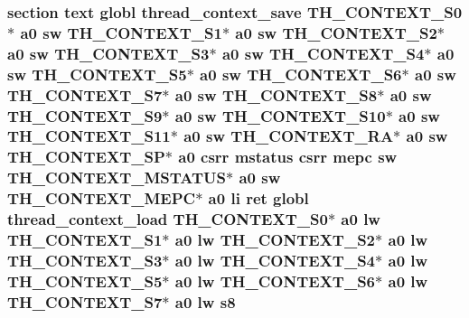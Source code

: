 \hypertarget{riscv_2threada_8S_a8be515ea1b76ad636be3ffda6de9a4f3}{
\subsubsection[{s8}]{\setlength{\rightskip}{0pt plus 5cm}section text globl {\bf thread\-\_\-context\-\_\-save} {\bf T\-H\-\_\-\-C\-O\-N\-T\-E\-X\-T\-\_\-\-S0}$\ast$ {\bf a0} {\bf sw} {\bf T\-H\-\_\-\-C\-O\-N\-T\-E\-X\-T\-\_\-\-S1}$\ast$ {\bf a0} {\bf sw} {\bf T\-H\-\_\-\-C\-O\-N\-T\-E\-X\-T\-\_\-\-S2}$\ast$ {\bf a0} {\bf sw} {\bf T\-H\-\_\-\-C\-O\-N\-T\-E\-X\-T\-\_\-\-S3}$\ast$ {\bf a0} {\bf sw} {\bf T\-H\-\_\-\-C\-O\-N\-T\-E\-X\-T\-\_\-\-S4}$\ast$ {\bf a0} {\bf sw} {\bf T\-H\-\_\-\-C\-O\-N\-T\-E\-X\-T\-\_\-\-S5}$\ast$ {\bf a0} {\bf sw} {\bf T\-H\-\_\-\-C\-O\-N\-T\-E\-X\-T\-\_\-\-S6}$\ast$ {\bf a0} {\bf sw} {\bf T\-H\-\_\-\-C\-O\-N\-T\-E\-X\-T\-\_\-\-S7}$\ast$ {\bf a0} {\bf sw} {\bf T\-H\-\_\-\-C\-O\-N\-T\-E\-X\-T\-\_\-\-S8}$\ast$ {\bf a0} {\bf sw} {\bf T\-H\-\_\-\-C\-O\-N\-T\-E\-X\-T\-\_\-\-S9}$\ast$ {\bf a0} {\bf sw} {\bf T\-H\-\_\-\-C\-O\-N\-T\-E\-X\-T\-\_\-\-S10}$\ast$ {\bf a0} {\bf sw} {\bf T\-H\-\_\-\-C\-O\-N\-T\-E\-X\-T\-\_\-\-S11}$\ast$ {\bf a0} {\bf sw} {\bf T\-H\-\_\-\-C\-O\-N\-T\-E\-X\-T\-\_\-\-R\-A}$\ast$ {\bf a0} {\bf sw} {\bf T\-H\-\_\-\-C\-O\-N\-T\-E\-X\-T\-\_\-\-S\-P}$\ast$ {\bf a0} csrr {\bf mstatus} csrr {\bf mepc} {\bf sw} {\bf T\-H\-\_\-\-C\-O\-N\-T\-E\-X\-T\-\_\-\-M\-S\-T\-A\-T\-U\-S}$\ast$ {\bf a0} {\bf sw} {\bf T\-H\-\_\-\-C\-O\-N\-T\-E\-X\-T\-\_\-\-M\-E\-P\-C}$\ast$ {\bf a0} {\bf li} ret globl {\bf thread\-\_\-context\-\_\-load} {\bf T\-H\-\_\-\-C\-O\-N\-T\-E\-X\-T\-\_\-\-S0}$\ast$ {\bf a0} {\bf lw} {\bf T\-H\-\_\-\-C\-O\-N\-T\-E\-X\-T\-\_\-\-S1}$\ast$ {\bf a0} {\bf lw} {\bf T\-H\-\_\-\-C\-O\-N\-T\-E\-X\-T\-\_\-\-S2}$\ast$ {\bf a0} {\bf lw} {\bf T\-H\-\_\-\-C\-O\-N\-T\-E\-X\-T\-\_\-\-S3}$\ast$ {\bf a0} {\bf lw} {\bf T\-H\-\_\-\-C\-O\-N\-T\-E\-X\-T\-\_\-\-S4}$\ast$ {\bf a0} {\bf lw} {\bf T\-H\-\_\-\-C\-O\-N\-T\-E\-X\-T\-\_\-\-S5}$\ast$ {\bf a0} {\bf lw} {\bf T\-H\-\_\-\-C\-O\-N\-T\-E\-X\-T\-\_\-\-S6}$\ast$ {\bf a0} {\bf lw} {\bf T\-H\-\_\-\-C\-O\-N\-T\-E\-X\-T\-\_\-\-S7}$\ast$ {\bf a0} {\bf lw} s8}}\label{riscv_2threada_8S_a8be515ea1b76ad636be3ffda6de9a4f3}
